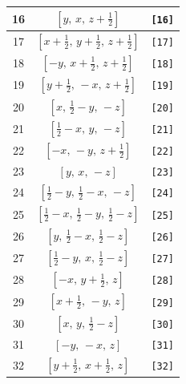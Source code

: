 \documentclass[fleqn,8pt]{jsarticle}
\begin{document}
\begin{longtable}{ccc}
16 & $\left[ y,\, x,\, z + \frac{1}{2} \right]$ & {\tt [16]} \\ \hline
17 & $\left[ x + \frac{1}{2},\, y + \frac{1}{2},\, z + \frac{1}{2} \right]$ & {\tt [17]} \\ \hline
18 & $\left[ - y,\, x + \frac{1}{2},\, z + \frac{1}{2} \right]$ & {\tt [18]} \\ \hline
19 & $\left[ y + \frac{1}{2},\, - x,\, z + \frac{1}{2} \right]$ & {\tt [19]} \\ \hline
20 & $\left[ x,\, \frac{1}{2} - y,\, - z \right]$ & {\tt [20]} \\ \hline
21 & $\left[ \frac{1}{2} - x,\, y,\, - z \right]$ & {\tt [21]} \\ \hline
22 & $\left[ - x,\, - y,\, z + \frac{1}{2} \right]$ & {\tt [22]} \\ \hline
23 & $\left[ y,\, x,\, - z \right]$ & {\tt [23]} \\ \hline
24 & $\left[ \frac{1}{2} - y,\, \frac{1}{2} - x,\, - z \right]$ & {\tt [24]} \\ \hline
25 & $\left[ \frac{1}{2} - x,\, \frac{1}{2} - y,\, \frac{1}{2} - z \right]$ & {\tt [25]} \\ \hline
26 & $\left[ y,\, \frac{1}{2} - x,\, \frac{1}{2} - z \right]$ & {\tt [26]} \\ \hline
27 & $\left[ \frac{1}{2} - y,\, x,\, \frac{1}{2} - z \right]$ & {\tt [27]} \\ \hline
28 & $\left[ - x,\, y + \frac{1}{2},\, z \right]$ & {\tt [28]} \\ \hline
29 & $\left[ x + \frac{1}{2},\, - y,\, z \right]$ & {\tt [29]} \\ \hline
30 & $\left[ x,\, y,\, \frac{1}{2} - z \right]$ & {\tt [30]} \\ \hline
31 & $\left[ - y,\, - x,\, z \right]$ & {\tt [31]} \\ \hline
32 & $\left[ y + \frac{1}{2},\, x + \frac{1}{2},\, z \right]$ & {\tt [32]} \\
\end{longtable}
\end{document}
